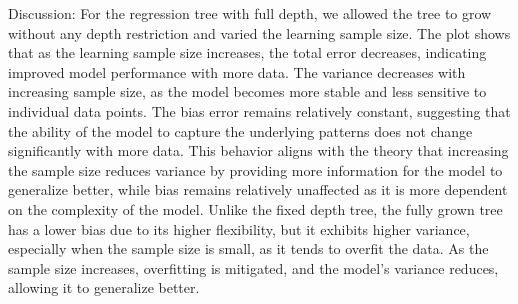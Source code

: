 \documentclass[a4paper,10pt]{article}
\begin{document}
Discussion:  
For the regression tree with full depth, we allowed the tree to grow without any depth restriction and varied the learning sample size. The plot shows that as the learning sample size increases, the total error decreases, indicating improved model performance with more data. The variance decreases with increasing sample size, as the model becomes more stable and less sensitive to individual data points. The bias error remains relatively constant, suggesting that the ability of the model to capture the underlying patterns does not change significantly with more data. This behavior aligns with the theory that increasing the sample size reduces variance by providing more information for the model to generalize better, while bias remains relatively unaffected as it is more dependent on the complexity of the model. Unlike the fixed depth tree, the fully grown tree has a lower bias due to its higher flexibility, but it exhibits higher variance, especially when the sample size is small, as it tends to overfit the data. As the sample size increases, overfitting is mitigated, and the model's variance reduces, allowing it to generalize better.




    
        
\end{document}
